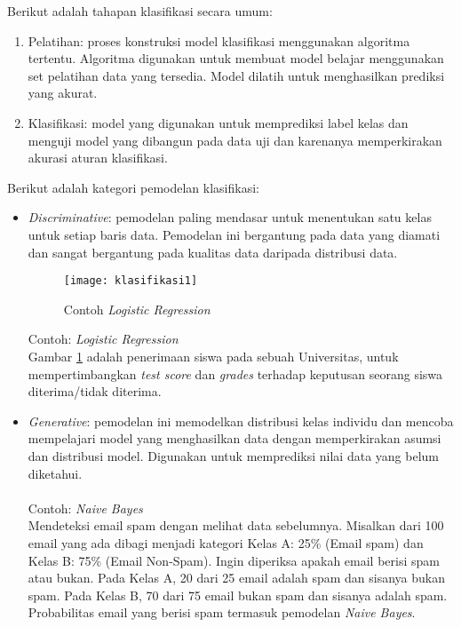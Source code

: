 \noindent Berikut adalah tahapan klasifikasi secara umum:
\begin{enumerate}

\item
Pelatihan: proses konstruksi model klasifikasi menggunakan algoritma tertentu. Algoritma digunakan untuk membuat model belajar menggunakan set pelatihan data yang tersedia. Model dilatih untuk menghasilkan prediksi yang akurat.

\item
Klasifikasi: model yang digunakan untuk memprediksi label kelas dan menguji model yang dibangun pada data uji dan karenanya memperkirakan akurasi aturan klasifikasi.
\end{enumerate}
\vspace{0.3cm}
\noindent Berikut adalah kategori pemodelan klasifikasi:
\begin{itemize}

\item 
\textit{Discriminative}: pemodelan paling mendasar untuk menentukan satu kelas untuk setiap baris data. Pemodelan ini bergantung pada data yang diamati dan sangat bergantung pada kualitas data daripada distribusi data.

\begin{figure}[H]
	\centering
	\texttt{[image: klasifikasi1]}
	\caption{Contoh \textit{Logistic Regression}}
	\label{fig:klasifikasi1}
\end{figure}

Contoh: \textit{Logistic Regression}\\
Gambar \ref{fig:klasifikasi1} adalah penerimaan siswa pada sebuah Universitas, untuk mempertimbangkan \textit{test score} dan \textit{grades} terhadap keputusan seorang siswa diterima/tidak diterima.

\item 
\textit{Generative}: pemodelan ini memodelkan distribusi kelas individu dan mencoba mempelajari model yang menghasilkan data dengan memperkirakan asumsi dan distribusi model. Digunakan untuk memprediksi nilai data yang belum diketahui. \\\\
Contoh: \textit{Naive Bayes} \\
Mendeteksi email spam dengan melihat data sebelumnya. Misalkan dari 100 email yang ada dibagi menjadi kategori Kelas A: 25\% (Email spam) dan Kelas B: 75\% (Email Non-Spam). Ingin diperiksa apakah email berisi  spam atau bukan. Pada Kelas A, 20 dari 25 email adalah spam dan sisanya bukan spam. Pada Kelas B, 70 dari 75 email bukan spam dan sisanya adalah spam. Probabilitas email yang berisi spam termasuk pemodelan \textit{Naive Bayes}. \\
\end{itemize}

